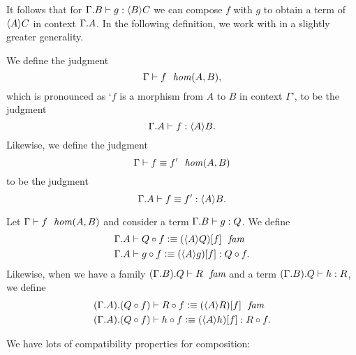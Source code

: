 It follows that for $\jterm{{\Gamma}{B}}{\ctxwk{B}{C}}{g}$ we can compose $f$
with $g$ to obtain a term of $\ctxwk{A}{C}$ in context $\ctxext{\Gamma}{A}$.
In the following definition, we work with in a slightly greater generality.

\begin{defn}
We define the judgment
\begin{equation*}
\jhom{\Gamma}{A}{B}{f},
\end{equation*}
which is pronounced as `$f$ is a morphism from $A$ to $B$ in context $\Gamma$',
to be the judgment
\begin{equation*}
\unfold{\jhom{\Gamma}{A}{B}{f}}.
\end{equation*}
Likewise, we define the judgment
\begin{equation*}
\jhomeq{\Gamma}{A}{B}{f}{f'}
\end{equation*}
to be the judgment
\begin{equation*}
\unfold{\jhomeq{\Gamma}{A}{B}{f}{f'}}.
\end{equation*}
\end{defn}

\begin{defn}
Let $\jhom{\Gamma}{A}{B}{f}$ and consider a term $\jterm{{\Gamma}{B}}{Q}{g}$.
We define
\begin{align*}
\jfamdefn*
  {{\Gamma}{A}}
  {\jcomp{A}{f}{Q}}
  {\unfold{\jcomp{A}{f}{Q}}}\\
\jtermdefn*
  {{\Gamma}{A}}
  {\jcomp{A}{f}{Q}}
  {\jcomp{A}{f}{g}}
  {\unfold{\jcomp{A}{f}{g}}}.
\end{align*}
Likewise, when we have a family $\jfam{{{\Gamma}{B}}{Q}}{R}$ and a term
$\jterm{{{\Gamma}{B}}{Q}}{R}{h}$, we define
\begin{align*}
\jfamdefn*{{{\Gamma}{A}}{\jcomp{A}{f}{Q}}}{\jcomp{A}{f}{R}}{\unfold{\jcomp{A}{f}{R}}}\\
\jtermdefn*{{{\Gamma}{A}}{\jcomp{A}{f}{Q}}}{\jcomp{A}{f}{R}}{\jcomp{A}{f}{h}}{\unfold{\jcomp{A}{f}{h}}}.
\end{align*}
\end{defn}

We have lots of compatibility properties for composition:

